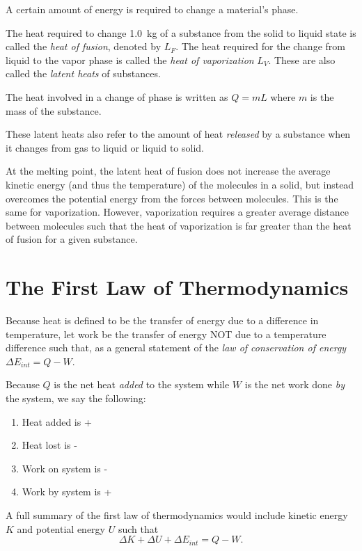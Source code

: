 \begin{definition}
    A certain amount of energy is required to change a material's phase.
\end{definition}
\begin{definition}
    The heat required to change \qty{1.0}{kg} of a substance from the solid to liquid state is called the \emph{heat of fusion}, denoted by $L_F$. The heat required for the change from liquid to the vapor phase is called the \emph{heat of vaporization} $L_V$. These are also called the \emph{latent heats} of substances.

    The heat involved in a change of phase is written as $Q = mL$ where $m$ is the mass of the substance.
\end{definition}
\begin{remark}
    These latent heats also refer to the amount of heat \emph{released} by a substance when it changes from gas to liquid or liquid to solid.
\end{remark}
\begin{remark}
    At the melting point, the latent heat of fusion does not increase the average kinetic energy (and thus the temperature) of the molecules in a solid, but instead overcomes the potential energy from the forces between molecules. This is the same for vaporization. However, vaporization requires a greater average distance between molecules such that the heat of vaporization is far greater than the heat of fusion for a given substance.
\end{remark}

\section{The First Law of Thermodynamics}

\begin{definition}
    Because heat is defined to be the transfer of energy due to a difference in temperature, let work be the transfer of energy NOT due to a temperature difference such that, as a general statement of the \emph{law of conservation of energy} $\Delta E_{int} = Q - W$.
\end{definition}
\begin{note}
    Because $Q$ is the net heat \emph{added} to the system while $W$ is the net work done \emph{by} the system, we say the following:
    \begin{enumerate}
        \item Heat added is +
        \item Heat lost is -
        \item Work on system is -
        \item Work by system is +
    \end{enumerate}
\end{note}
\begin{remark}
    A full summary of the first law of thermodynamics would include kinetic energy $K$ and potential energy $U$ such that $$\Delta K + \Delta U + \Delta E_{int} = Q-W.$$
\end{remark}

